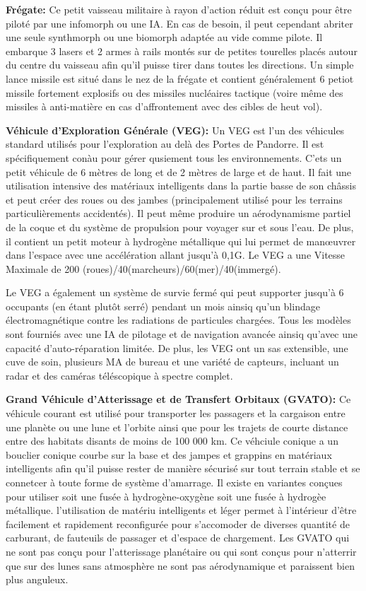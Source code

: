 \textbf{Frégate:} Ce petit vaisseau militaire à rayon d'action réduit est conçu pour être piloté par une infomorph ou une IA. En cas de besoin, il peut cependant abriter une seule synthmorph ou une biomorph adaptée au vide comme pilote. Il embarque 3 lasers et 2 armes à rails montés sur de petites tourelles placés autour du centre du vaisseau afin qu'il puisse tirer dans toutes les directions. Un simple lance missile est situé dans le nez de la frégate et contient généralement 6 petiot missile fortement explosifs ou des missiles nucléaires tactique (voire même des missiles à anti-matière en cas d'affrontement avec des cibles de heut vol). 

\textbf{Véhicule d'Exploration Générale (VEG):} Un VEG est l'un des véhicules standard utilisés pour l'exploration au delà des Portes de Pandorre. Il est spécifiquement conàu pour gérer qusiement tous les environnements. C'ets un petit véhicule de 6 mètres de long et de 2  mètres de large et de haut. Il fait une utilisation intensive des matériaux intelligents dans la partie basse de son châssis et peut créer des roues ou des jambes (principalement utilisé pour les terrains particulièrements accidentés). Il peut même produire un aérodynamisme partiel de la coque et du système de propulsion pour voyager sur et sous l'eau. De plus, il contient un petit moteur à hydrogène métallique qui lui permet de manœuvrer dans l'espace avec une accélération allant jusqu'à 0,1G. Le VEG a une Vitesse Maximale de 200 (roues)/40(marcheurs)/60(mer)/40(immergé). 

Le VEG a également un système de survie fermé qui peut supporter jusqu'à 6 occupants (en étant plutôt serré) pendant un mois ainsiq qu'un blindage électromagnétique contre les radiations de particules chargées. Tous les modèles sont fourniés avec une IA de pilotage et de navigation avancée ainsiq qu'avec une capacité d'auto-réparation limitée. De plus, les VEG ont un sas extensible, une cuve de soin, plusieurs MA de bureau et une variété de capteurs, incluant un radar et des caméras téléscopique à spectre complet. 

\textbf{Grand Véhicule d'Atterissage et de Transfert Orbitaux (GVATO):} Ce véhicule courant est utilisé pour transporter les passagers et la cargaison entre une planète ou une lune et l'orbite ainsi que pour les trajets de courte distance entre des habitats disants de moins de 100 000 km. Ce véhciule conique a un bouclier conique courbe sur la base et des jampes et grappins en matériaux intelligents afin qu'il puisse rester de manière sécurisé sur tout terrain stable et se connetcer à toute forme de système d'amarrage. Il existe en variantes conçues pour utiliser soit une fusée à hydrogène-oxygène soit une fusée à hydrogèe métallique. l'utilisation de matériu intelligents et léger permet à l'intérieur d'être facilement et rapidement reconfigurée pour s'accomoder de diverses quantité de carburant, de fauteuils de passager et d'espace de chargement. Les GVATO qui ne sont pas conçu pour l'atterissage planétaire ou qui sont conçus pour n'atterrir que sur des lunes sans atmosphère ne sont pas aérodynamique et paraissent bien plus anguleux. 

